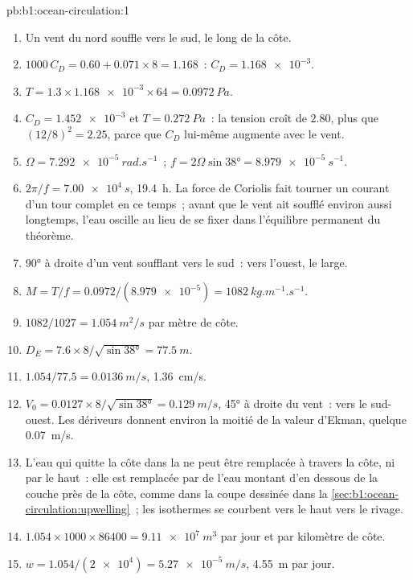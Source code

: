\begin{solution}{pb:b1:ocean-circulation:1}
\begin{enumerate}
  \item Un vent du nord souffle vers le sud, le long de la côte.
  \item $1000\,C_D = 0.60 + 0.071 \times 8 = 1.168$~: $C_D = \num{1.168e-3}$.
  \item $T = 1.3 \times \num{1.168e-3} \times 64 = \qty{0.0972}{Pa}$.
  \item $C_D = \num{1.452e-3}$ et $T = \qty{0.272}{Pa}$~: la tension croît de $2.80$,
        plus que $(12/8)^2 = 2.25$, parce que $C_D$ lui-même augmente avec le vent.
  \item $\Omega = \qty{7.292e-5}{rad.s^{-1}}$~; $f = 2\Omega\sin\ang{38} =
        \qty{8.979e-5}{s^{-1}}$.
  \item $2\pi/f = \qty{7.00e4}{s}$, \qty{19.4}{h}. La force de Coriolis fait tourner un
        courant d'un tour complet en ce temps~; avant que le vent ait soufflé
        environ aussi longtemps, l'eau oscille au lieu de se fixer dans l'équilibre
        permanent du théorème.
  \item \ang{90} à droite d'un vent soufflant vers le sud~: vers l'ouest, le
        large.
  \item $M = T/f = 0.0972/(\num{8.979e-5}) = \qty{1082}{kg.m^{-1}.s^{-1}}$.
  \item $1082/1027 = \qty{1.054}{m^2/s}$ par mètre de côte.
  \item $D_E = 7.6 \times 8/\sqrt{\sin\ang{38}} = \qty{77.5}{m}$.
  \item $1.054/77.5 = \qty{0.0136}{m/s}$, \qty{1.36}{cm/s}.
  \item $V_0 = 0.0127 \times 8/\sqrt{\sin\ang{38}} = \qty{0.129}{m/s}$, \ang{45} à
        droite du vent~: vers le sud-ouest. Les dériveurs donnent environ la moitié
        de la valeur d'Ekman, quelque \qty{0.07}{m/s}.
  \item L'eau qui quitte la côte dans la  ne peut être remplacée à travers la
        côte, ni par le haut~: elle est remplacée par de l'eau montant d'en dessous de la couche
        près de la côte, comme dans la coupe dessinée dans la
        \cref{sec:b1:ocean-circulation:upwelling}~; les isothermes se courbent vers le haut vers le
        rivage.
  \item $1.054 \times 1000 \times 86400 = \qty{9.11e7}{m^3}$ par jour et par kilomètre de
        côte.
  \item $w = 1.054/(\num{2e4}) = \qty{5.27e-5}{m/s}$, \qty{4.55}{m} par jour.

\end{enumerate}
\end{solution}

